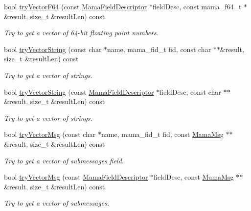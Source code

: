 \begin{DoxyCompactItemize}
bool \hyperlink{classWombat_1_1MamaMsg_afff62156a02e1c92a822af9b4b55d576}{tryVectorF64} (const \hyperlink{classWombat_1_1MamaFieldDescriptor}{MamaFieldDescriptor} $\ast$fieldDesc, const mama\_\-f64\_\-t $\ast$\&result, size\_\-t \&resultLen) const 
\begin{DoxyCompactList}\small\item\em Try to get a vector of 64-\/bit floating point numbers. \item\end{DoxyCompactList}\item 
bool \hyperlink{classWombat_1_1MamaMsg_a711caae570aeb5b314b630f7c6377dcf}{tryVectorString} (const char $\ast$name, mama\_\-fid\_\-t fid, const char $\ast$$\ast$\&result, size\_\-t \&resultLen) const 
\begin{DoxyCompactList}\small\item\em Try to get a vector of strings. \item\end{DoxyCompactList}\item 
bool \hyperlink{classWombat_1_1MamaMsg_aac7467df406b4718a0139e38267203ac}{tryVectorString} (const \hyperlink{classWombat_1_1MamaFieldDescriptor}{MamaFieldDescriptor} $\ast$fieldDesc, const char $\ast$$\ast$\&result, size\_\-t \&resultLen) const 
\begin{DoxyCompactList}\small\item\em Try to get a vector of strings. \item\end{DoxyCompactList}\item 
bool \hyperlink{classWombat_1_1MamaMsg_aceeef571c12d1cf4087acd6690efa5cb}{tryVectorMsg} (const char $\ast$name, mama\_\-fid\_\-t fid, const \hyperlink{classWombat_1_1MamaMsg}{MamaMsg} $\ast$$\ast$\&result, size\_\-t \&resultLen) const 
\begin{DoxyCompactList}\small\item\em Try to get a vector of submessages field. \item\end{DoxyCompactList}\item 
bool \hyperlink{classWombat_1_1MamaMsg_a2ea378cc414893c92de2bdf0de4e09dc}{tryVectorMsg} (const \hyperlink{classWombat_1_1MamaFieldDescriptor}{MamaFieldDescriptor} $\ast$fieldDesc, const \hyperlink{classWombat_1_1MamaMsg}{MamaMsg} $\ast$$\ast$\&result, size\_\-t \&resultLen) const 
\begin{DoxyCompactList}\small\item\em Try to get a vector of submessages. \item\end{DoxyCompactList}\item 

\end{DoxyCompactItemize}
